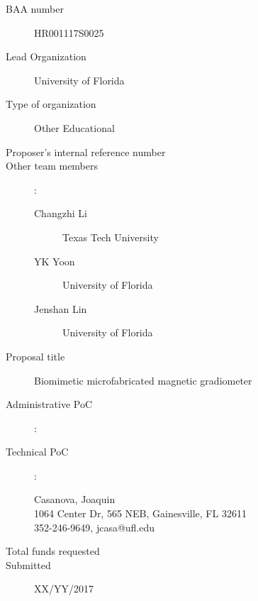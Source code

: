 
\begin{description}
\item [BAA number] HR001117S0025
\item [Lead Organization] University of Florida
\item [Type of organization] Other Educational
\item [Proposer’s internal reference number]
\item [Other team members]:
\begin{description}
\item [Changzhi Li] Texas Tech University
\item [YK Yoon] University of Florida 
\item [Jenshan Lin] University of Florida 
\end{description}
\item [Proposal title] Biomimetic microfabricated magnetic gradiometer
\item [Administrative PoC]:
\begin{description}
\item []
\item []
\item []
\end{description}
\item [Technical PoC]:
\begin{description}
\item [Casanova, Joaquin]
\item [1064 Center Dr, 565 NEB, Gainesville, FL 32611]
\item [352-246-9649, jcasa@ufl.edu]
\end{description}
\item [Total funds requested]
\item [Submitted] XX/YY/2017


\end{description}

